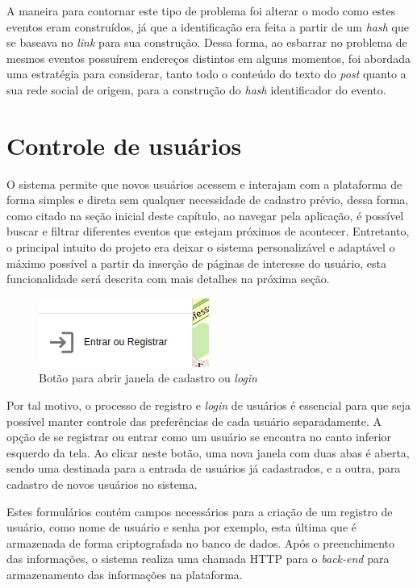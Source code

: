 A maneira para contornar este tipo de problema foi alterar o modo como estes
eventos eram construídos, já que a identificação era feita a partir de um
\textit{hash} que se baseava no \textit{link} para sua construção. Dessa forma,
ao esbarrar no problema de mesmos eventos possuírem endereços distintos em
alguns momentos, foi abordada uma estratégia para considerar, tanto todo o
conteúdo do texto do \textit{post} quanto a sua rede social de origem, para a
construção do \textit{hash} identificador do evento.

\section{Controle de usuários}

O sistema permite que novos usuários acessem e interajam com a plataforma de
forma simples e direta sem qualquer necessidade de cadastro prévio, dessa
forma, como citado na seção inicial deste capítulo, ao navegar pela aplicação,
é possível buscar e filtrar diferentes eventos que estejam próximos de
acontecer. Entretanto, o principal intuito do projeto era deixar o sistema
personalizável e adaptável o máximo possível a partir da inserção de páginas de
interesse do usuário, esta funcionalidade será descrita com mais detalhes na
próxima seção.

\begin{figure}[h]
    \centering
    \includegraphics[scale=.8]{figuras/loginButton.png}
    \caption{Botão para abrir janela de cadastro ou \textit{login}}
\end{figure}

Por tal motivo, o processo de registro e \textit{login} de usuários é essencial
para que seja possível manter controle das preferências de cada usuário
separadamente. A opção de se registrar ou entrar como um usuário se encontra no
canto inferior esquerdo da tela. Ao clicar neste botão, uma nova janela com
duas abas é aberta, sendo uma destinada para a entrada de usuários já
cadastrados, e a outra, para cadastro de novos usuários no sistema.

Estes formulários contém campos necessários para a criação de um registro de
usuário, como nome de usuário e senha por exemplo, esta última que é armazenada
de forma criptografada no banco de dados. Após o preenchimento das informações,
o sistema realiza uma chamada \acs{HTTP} para o \textit{back-end} para
armazenamento das informações na plataforma.

